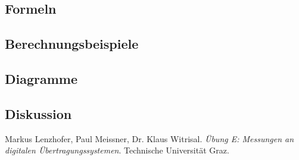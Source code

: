 \documentclass[12pt,a4paper,ngerman]{article}
\begin{document}
\subsection{Formeln}

\subsection{Berechnungsbeispiele}

\subsection{Diagramme}

\subsection{Diskussion}

\begin{thebibliography}{9}

  Markus Lenzhofer, Paul Meissner, Dr. Klaus Witrisal.
  \emph{Übung E: Messungen an digitalen Übertragungssystemen}.
  Technische Universität Graz.

\end{thebibliography}


 



   
\end{document}
